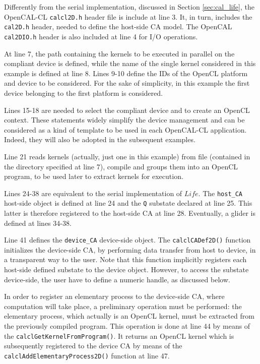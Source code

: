 

Differently from the serial implementation, discussed in Section
\ref{sec:cal_life}, the OpenCAL-CL \verb'calcl2D.h' header file is
include at line 3. It, in turn, includes the \verb'cal2D.h' header,
needed to define the host-side CA model. The OpenCAL \verb'cal2DIO.h'
header is also included at line 4 for I/O operations.

At line 7, the path containing the kernels to be executed in parallel
on the compliant device is defined, while the name of the single
kernel considered in this example is defined at line 8. Lines 9-10
define the IDs of the OpenCL platform and device to be considered. For the sake of simplicity, in
this example the first device belonging to the first platform is
considered.

Lines 15-18 are needed to select the compliant device and to create an
OpenCL context. These statements widely simplify the device management
and can be considered as a kind of template to be used in each
OpenCAL-CL application. Indeed, they will also be adopted in the
subsequent examples.

Line 21 reads kernels (actually, just one in this example) from file
(contained in the directory specified at line 7), compile and groups
them into an OpenCL program, to be used later to extract kernels for
execution.

Lines 24-38 are equivalent to the serial implementation of $Life$. The
\verb'host_CA' host-side object is defined at line 24 and the \verb'Q'
substate declared at line 25. This latter is therefore registered to
the host-side CA at line 28. Eventually, a glider is defined at lines
34-38.

Line 41 defines the \verb'device_CA' device-side object. The
\verb'calclCADef2D()' function initializes the device-side CA, by
performing data transfer from host to device, in a transparent way to
the user. Note that this function implicitly registers each host-side
defined substate to the device object. However, to access the substate
device-side, the user have to define a numeric handle, as discussed
below.

In order to register an elementary process to the device-side CA,
where computation will take place, a preliminary operation must be
performed: the elementary process, which actually is an OpenCL kernel,
must be extracted from the previously compiled program. This operation
is done at line 44 by means of the
\verb'calclGetKernelFromProgram()'. It returns an OpenCL kernel which
is subsequently registered to the device CA by means of the
\verb'calclAddElementaryProcess2D()' function at line 47.


